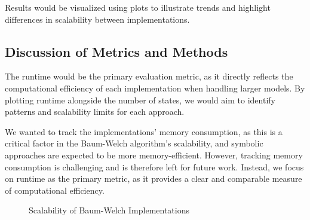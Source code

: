 Results would be visualized using plots to illustrate trends and highlight differences in scalability between implementations.

\subsection{Discussion of Metrics and Methods}
The runtime would be the primary evaluation metric, as it directly reflects the computational efficiency of each implementation when handling larger models. 
By plotting runtime alongside the number of states, we would aim to identify patterns and scalability limits for each approach.

We wanted to track the implementations' memory consumption, as this is a critical factor in the Baum-Welch algorithm's scalability, and symbolic approaches are expected to be more memory-efficient.
However, tracking memory consumption is challenging and is therefore left for future work.
Instead, we focus on runtime as the primary metric, as it provides a clear and comparable measure of computational efficiency.



\begin{figure}[htb!]
    \centering
    
    \caption{Scalability of Baum-Welch Implementations}
    \label{fig:scalability}
\end{figure}